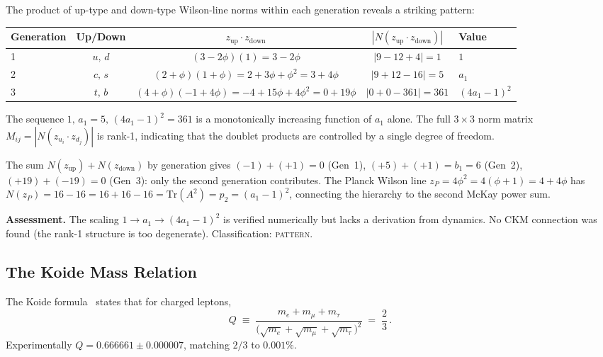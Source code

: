 \documentclass[12pt,a4paper]{article}
\theoremstyle{definition}
\begin{document}
The product of up-type and down-type Wilson-line norms within each generation reveals a striking pattern:

\begin{center}
\begin{tabular}{lcccl}
\toprule
\textbf{Generation} & \textbf{Up/Down} & $z_{\text{up}} \cdot z_{\text{down}}$ & $|N(z_{\text{up}} \cdot z_{\text{down}})|$ & \textbf{Value} \\
\midrule
1 & $u,\, d$ & $(3-2\phi)(1) = 3-2\phi$ & $|9 - 12 + 4| = 1$ & $1$ \\
2 & $c,\, s$ & $(2+\phi)(1+\phi) = 2+3\phi+\phi^2 = 3+4\phi$ & $|9+12-16| = 5$ & $a_1$ \\
3 & $t,\, b$ & $(4+\phi)(-1+4\phi) = -4+15\phi+4\phi^2 = 0 + 19\phi$ & $|0+0-361| = 361$ & $(4a_1-1)^2$ \\
\bottomrule
\end{tabular}
\end{center}

The sequence $1,\, a_1 = 5,\, (4a_1-1)^2 = 361$ is a monotonically increasing function of $a_1$ alone.  The full $3 \times 3$ norm matrix $M_{ij} = |N(z_{u_i} \cdot z_{d_j})|$ is rank-1, indicating that the doublet products are controlled by a single degree of freedom.

The sum $N(z_{\text{up}}) + N(z_{\text{down}})$ by generation gives $(-1) + (+1) = 0$ (Gen~1), $(+5) + (+1) = b_1 = 6$ (Gen~2), $(+19) + (-19) = 0$ (Gen~3): only the second generation contributes.  The Planck Wilson line $z_P = 4\phi^2 = 4(\phi+1) = 4+4\phi$ has $N(z_P) = 16 - 16 = 16 + 16 - 16 = \mathrm{Tr}(A^2) = p_2 = (a_1-1)^2$, connecting the hierarchy to the second McKay power sum.

\textbf{Assessment.}  The scaling $1 \to a_1 \to (4a_1-1)^2$ is verified numerically but lacks a derivation from dynamics.  No CKM connection was found (the rank-1 structure is too degenerate).  Classification: \textsc{pattern}.

\subsection{The Koide Mass Relation}
\label{sec:S-koide}

The Koide formula~\cite{Koide1983} states that for charged leptons,
\begin{equation}
Q \;\equiv\; \frac{m_e + m_\mu + m_\tau}{\bigl(\sqrt{m_e} + \sqrt{m_\mu} + \sqrt{m_\tau}\bigr)^2} \;=\; \frac{2}{3}\,.
\end{equation}
Experimentally $Q = 0.666661 \pm 0.000007$, matching $2/3$ to $0.001\%$.
\end{document}
